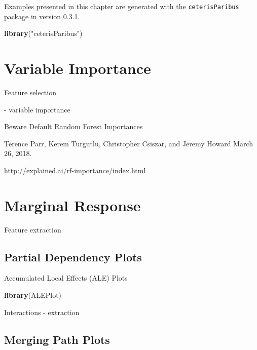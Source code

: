 \documentclass[]{krantz}
\newenvironment{Shaded}{\begin{snugshade}}{\end{snugshade}}
\newcommand{\KeywordTok}[1]{\textcolor[rgb]{0.13,0.29,0.53}{\textbf{#1}}}
\newcommand{\NormalTok}[1]{#1}
\newcommand{\StringTok}[1]{\textcolor[rgb]{0.31,0.60,0.02}{#1}}
\theoremstyle{definition}
\theoremstyle{definition}
\theoremstyle{definition}
\theoremstyle{remark}
\begin{document}
Examples presented in this chapter are generated with the
\texttt{ceterisParibus} package in version 0.3.1.

\begin{Shaded}
\begin{Highlighting}[]
\KeywordTok{library}\NormalTok{(}\StringTok{"ceterisParibus"}\NormalTok{)}
\end{Highlighting}
\end{Shaded}

\hypertarget{variable-importance}{%
\section{Variable Importance}\label{variable-importance}}

Feature selection

\citep{Strobl2007} \citep{Strobl2008} - variable importance

\citep{2018arXiv180101489F}

Beware Default Random Forest Importances

Terence Parr, Kerem Turgutlu, Christopher Csiszar, and Jeremy Howard
March 26, 2018.

\url{http://explained.ai/rf-importance/index.html}

\hypertarget{marginal-response}{%
\section{Marginal Response}\label{marginal-response}}

Feature extraction

\hypertarget{partialDependence}{%
\subsection{Partial Dependency Plots}\label{partialDependence}}

Accumulated Local Effects (ALE) Plots

\citep{RJ2017016} \citep{R-ALEPlot}

\begin{Shaded}
\begin{Highlighting}[]
\KeywordTok{library}\NormalTok{(ALEPlot)}
\end{Highlighting}
\end{Shaded}

\citep{MAGIX}

Interactions - extraction

\hypertarget{merging-path-plots}{%
\subsection{Merging Path Plots}\label{merging-path-plots}}
\end{document}

